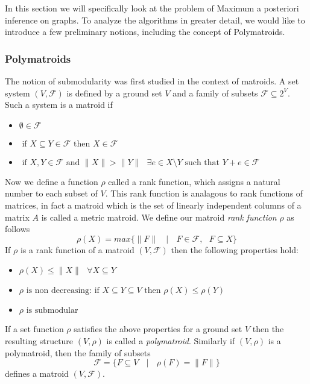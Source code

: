 In this section we will specifically look at the problem of Maximum a posteriori inference on graphs. To analyze the algorithms in greater detail, we would like to introduce a few preliminary notions, including the concept of Polymatroids. 
\subsubsection{Polymatroids}
The notion of submodularity was first studied in the context of matroids. A set system $(V,\mathcal{F})$ is defined by a ground set $V$ and a family of subsets $\mathcal{F} \subseteq 2^V$. Such a system is a matroid if
\begin{itemize}

\item $\emptyset \in \mathcal{F}$
\item $\text{ if } X \subseteq Y \in \mathcal{F} \text{ then } X\in \mathcal{F}$
\item $\text{ if } X,Y \in \mathcal{F} \text{ and } \|X\| > \|Y\| \text{ } \exists e\in X\setminus Y \text{ such that } Y+e\in\mathcal{F}$
\end{itemize}

Now we define a function $\rho$ called a rank function, which assigns a natural number to each subset of $V$. This rank function is analagous to rank functions of matrices, in fact a matroid which is the set of linearly independent columns of a matrix $A$ is called a metric matroid. We define our matroid {\it rank function} $\rho$ as follows
\[
\rho(X) = max\{\|F\| \text{ }\mid \text{ } F\in\mathcal{F}, \text{ }F\subseteq X\}
\]
If $\rho$ is a rank function of a matroid $(V,\mathcal{F})$ then the following properties hold:
\begin{itemize}
\item $\rho(X) \leq \|X\| \text{ }\forall X\subseteq Y$
\item $\rho \text{ is non decreasing: if } X \subseteq Y \subseteq V \text{ then } \rho(X) \leq \rho(Y)$
\item $\rho \text{ is submodular }$
\end{itemize}

If a set function $\rho$ satisfies the above properties for a ground set $V$ then the resulting structure $(V,\rho)$ is called a {\it polymatroid}. Similarly if $(V,\rho)$ is a polymatroid, then the family of subsets
\[
\mathcal{F} = \{ F\subseteq V \text{ }\mid \text{ } \rho(F) = \|F\|\}
\]
defines a matroid $(V,\mathcal{F})$.

